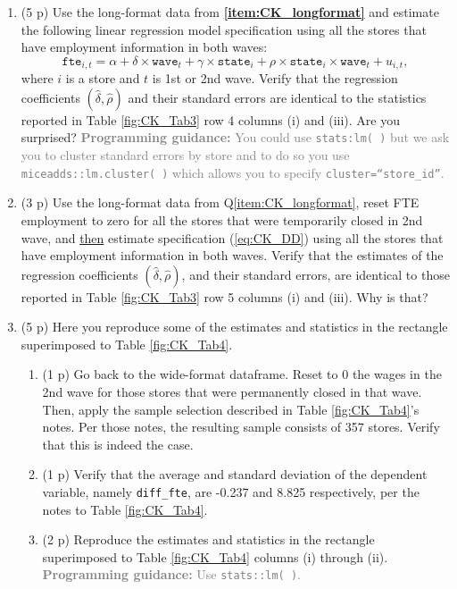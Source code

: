 \documentclass{article}
\begin{document}
\begin{enumerate}[label=\textbf{Q\arabic{enumi}}.,ref=Q\arabic{enumi}, wide=0pt, itemsep=0em, topsep=5pt, labelindent=0pt, resume]
\item (5 p) Use the long-format data from \textbf{\ref{item:CK_longformat}} and estimate the following linear regression model specification using all the stores that have employment information in both waves: 
\begin{equation}\label{eq:CK_DD}
\texttt{fte}_{i,t}=\alpha + \delta \times \texttt{wave}_t + \gamma \times \texttt{state}_i + \rho \times \texttt{state}_i\times\texttt{wave}_{t}+u_{i,t},
\end{equation}
\noindent where $i$ is a store and $t$ is 1st or 2nd wave. Verify that the regression coefficients $(\hat{\delta}, \hat{\rho})$ and their standard errors are identical to the statistics reported in Table \ref{fig:CK_Tab3} row 4 columns (i) and (iii). Are you surprised? \textcolor{gray}{\textbf{Programming guidance:} You could use \texttt{stats:lm( )} but we ask you to cluster standard errors by store and to do so you use \texttt{miceadds::lm.cluster( )} which allows you to specify \texttt{cluster=``store\_id''}.}
\item (3 p) Use the long-format data from Q\ref{item:CK_longformat}, reset FTE employment to zero for all the stores that were temporarily closed in 2nd wave, and \underline{then} estimate specification (\ref{eq:CK_DD}) using all the stores that have employment information in both waves. Verify that the estimates of the regression coefficients $(\hat{\delta}, \hat{\rho})$, and their standard errors, are identical to those reported in Table \ref{fig:CK_Tab3} row 5 columns (i) and (iii). Why is that?
\item (5 p) Here you reproduce some of the estimates and statistics in the rectangle superimposed to Table \ref{fig:CK_Tab4}.\label{item:CK_tab4-col-i-ii}
\begin{enumerate}
\item (1 p) Go back to the wide-format dataframe. Reset to 0 the wages in the 2nd wave for those stores that were permanently closed in that wave. Then, apply the sample selection described in Table \ref{fig:CK_Tab4}'s notes. Per those notes, the resulting sample consists of 357 stores. Verify that this is indeed the case.\label{item:CK_tab4-col-i-ii-dataset}
\item (1 p) Verify that the average and standard deviation of the dependent variable, namely \texttt{diff\_fte}, are -0.237 and 8.825 respectively, per the notes to Table \ref{fig:CK_Tab4}.
\item (2 p) Reproduce the estimates and statistics in the rectangle superimposed to Table \ref{fig:CK_Tab4} columns (i) through (ii). \textcolor{gray}{\textbf{Programming guidance:} Use \texttt{stats::lm( )}.}

\end{enumerate}
\end{enumerate}
\end{document}
